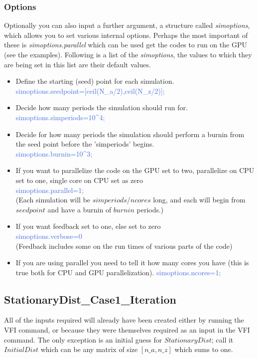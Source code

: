 \subsubsection{Options}
Optionally you can also input a further argument, a structure called \textit{simoptions}, which allows you to set various internal options. Perhaps
the most important of these is \textit{simoptions.parallel} which can be used get the codes to run on the GPU (see the examples).
Following is a list of the \textit{simoptions}, the values to which they are being set in this list are their default values.
\begin{itemize}
  \item Define the starting (seed) point for each simulation. \\
    \textcolor{RoyalBlue}{simoptions.seedpoint=[ceil(N\_{}a/2),ceil(N\_{}z/2)];}
  \item Decide how many periods the simulation should run for. \\
    \textcolor{RoyalBlue}{simoptions.simperiods=10\^{}4;}
  \item Decide for how many periods the simulation should perform a burnin from the seed point before the 'simperiods' begins. \\
    \textcolor{RoyalBlue}{simoptions.burnin=10\^{}3;}
  \item If you want to parallelize the code on the GPU set to two, parallelize on CPU set to one, single core on CPU set as zero \\
    \textcolor{RoyalBlue}{simoptions.parallel=1;} \\
    (Each simulation will be $simperiods$/$ncores$ long, and each will begin from $seedpoint$ and have a burnin of $burnin$ periods.)
  \item If you want feedback set to one, else set to zero \\
    \textcolor{RoyalBlue}{simoptions.verbose=0} \\
      (Feedback includes some on the run times of various parts of the code)
  \item If you are using parallel you need to tell it how many cores you have (this is true both for CPU and GPU parallelization). 
    \textcolor{RoyalBlue}{simoptions.ncores=1;}
\end{itemize}

\subsection{StationaryDist\_{}Case1\_{}Iteration}
All of the inputs required will already have been created either by running the VFI command, or because they were themselves required as an 
input in the VFI command. The only exception is an initial guess for $StationaryDist$; call it $InitialDist$ which can be any matrix of size $[n\_{}a,n\_{}z]$ which sums to one.

